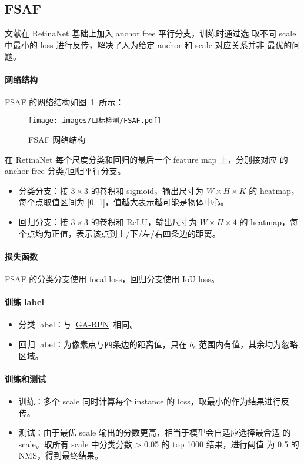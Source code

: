 \subsection{FSAF}
文献在 RetinaNet 基础上加入 anchor free 平行分支，训练时通过选
取不同 scale 中最小的 loss 进行反传，解决了人为给定 anchor 和 scale 对应关系并非
最优的问题。

\paragraph{网络结构}
FSAF 的网络结构如图~\ref{fig:FSAF}~所示：

\begin{figure}[ht]
  \centering
  \texttt{[image: images/目标检测/FSAF.pdf]}
  \caption{FSAF 网络结构}
  \label{fig:FSAF}
\end{figure}

在 RetinaNet 每个尺度分类和回归的最后一个 feature map 上，分别接对应
的 anchor free 分类/回归平行分支。

\begin{itemize}
  \item 分类分支：接 $3 \times 3$ 的卷积和 sigmoid，输出尺寸为 $W \times H \times
    K$ 的 heatmap，每个点取值区间为 [0, 1]，值越大表示越可能是物体中心。
  \item 回归分支：接 $3 \times 3$ 的卷积和 ReLU，输出尺寸为 $W \times H \times
    4$ 的 heatmap，每个点均为正值，表示该点到上/下/左/右四条边的距离。
\end{itemize}

\paragraph{损失函数}
FSAF 的分类分支使用 focal loss，回归分支使用 IoU loss。

\paragraph{训练 label}
\begin{itemize}
\item 分类 label：与~\hyperref[subsubsec:GA-RPN]{GA-RPN}~相同。
  \item 回归 label：为像素点与四条边的距离值，只在 $b_e$ 范围内有值，其余均为忽略区域。
\end{itemize}

\paragraph{训练和测试}
\begin{itemize}
  \item 训练：多个 scale 同时计算每个 instance 的 loss，取最小的作为结果进行反传。
  \item 测试：由于最优 scale 输出的分数更高，相当于模型会自适应选择最合适
    的 scale。取所有 scale 中分类分数 > 0.05 的 top 1000 结果，进行阈值
    为 0.5 的 NMS，得到最终结果。
\end{itemize}

